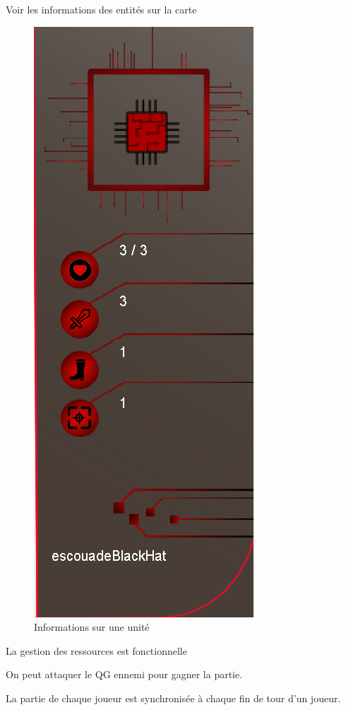 \documentclass[a4paper,11pt]{report}
\begin{document}
	
	Voir les informations des entités sur la carte
	 \begin{figure}[th]
	\begin{center}
	\includegraphics[scale=0.3]{Assets/InfosCarte.png} 
	\caption{Informations sur une unité}
     \label{InfoUnité}
      \end{center}
    \end{figure}

	
    La gestion des ressources est fonctionnelle
	
	 On peut attaquer le QG ennemi pour gagner la partie.
	
 La partie de chaque joueur est synchronisée à chaque fin de tour d'un joueur.
	
	


	
\end{document}
